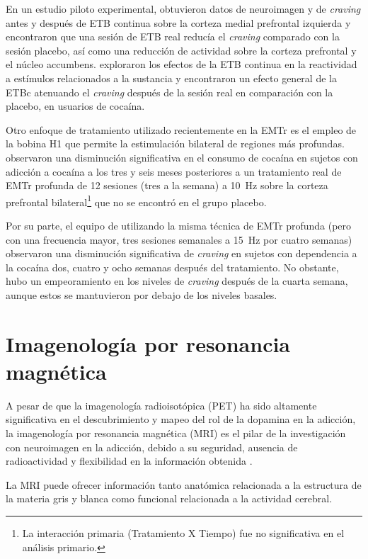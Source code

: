En un estudio piloto experimental, \textcite{Hanlon2015} obtuvieron datos de neuroimagen y de \textit{craving} antes y después de ETB continua sobre la corteza medial prefrontal izquierda y encontraron que una sesión de ETB real reducía el \textit{craving} comparado con la sesión placebo, así como una reducción de actividad sobre la corteza prefrontal y el núcleo accumbens.
\textcite{Kearney-Ramos2018a} exploraron los efectos de la ETB continua en la reactividad a estímulos relacionados a la sustancia y encontraron un efecto general de la ETBc atenuando el \textit{craving} después de la sesión real en comparación con la placebo, en usuarios de cocaína. \par
Otro enfoque de tratamiento utilizado recientemente en la EMTr es el empleo de la bobina H1 que permite la estimulación bilateral de regiones más profundas.
\textcite{Bolloni2016} observaron una disminución significativa en el consumo de cocaína en sujetos con adicción a cocaína a los tres y seis meses posteriores a un tratamiento real de EMTr profunda de 12 sesiones (tres a la semana) a \SI{10}{\hertz} sobre la corteza prefrontal bilateral\footnote{La interacción primaria (Tratamiento X Tiempo) fue no significativa en el análisis primario.} que no se encontró en el grupo placebo.\par
Por su parte, el equipo de \textcite{Rapinesi2016} utilizando la misma técnica de EMTr profunda (pero con una frecuencia mayor, tres sesiones semanales a \SI{15}{\hertz} por cuatro semanas) observaron una disminución significativa de \textit{craving} en sujetos con dependencia a la cocaína dos, cuatro y ocho semanas después del tratamiento.
No obstante, hubo un empeoramiento en los niveles de \textit{craving} después de la cuarta semana, aunque estos se mantuvieron por debajo de los niveles basales.

\section{Imagenología por resonancia magnética}
A pesar de que la imagenología radioisotópica (PET) ha sido altamente significativa en el descubrimiento y mapeo del rol de la dopamina en la adicción, la imagenología por resonancia magnética (MRI) es el pilar de la investigación con neuroimagen en la adicción, debido a su seguridad, ausencia de radioactividad y flexibilidad en la información obtenida \parencite{Suckling2017}. \par
La MRI puede ofrecer información tanto anatómica \textemdash{}relacionada a la estructura de la materia gris y blanca\textemdash{} como funcional \textemdash{}relacionada a la actividad cerebral.

